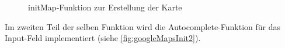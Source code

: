 \begin{figure}[!htbp]
	\caption{initMap-Funktion zur Erstellung der Karte}
	\label{fig:googleMapsInit}
\end{figure}

Im zweiten Teil der selben Funktion wird die Autocomplete-Funktion für das Input-Feld implementiert (siehe \vref{fig:googleMapsInit2}).

